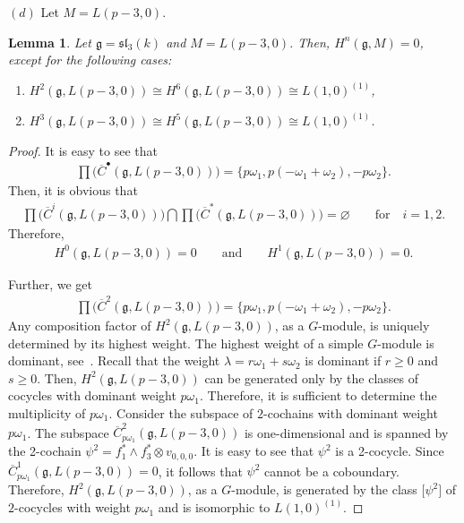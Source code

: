 \documentclass[10pt,a4paper]{amsart}
\numberwithin{equation}{section}
\newtheorem{Lemma}[Theorem]{Lemma}
\begin{document}
$(d)$ Let $M=L(p-3,0)$.

\begin{Lemma}\label{l3}
Let $\mathfrak{g}=\mathfrak{sl}_3(k)$ and $M=L(p-3,0)$. Then, $H^n(\mathfrak{g},M)=0$, except for the following cases:
\begin{enumerate}\itemsep=0pt

\item[$(i)$] $H^2(\mathfrak{g},L(p-3,0))\cong H^6(\mathfrak{g},L(p-3,0))\cong L(1,0)^{(1)}$,

\item[$(ii)$] $H^3(\mathfrak{g},L(p-3,0))\cong H^5(\mathfrak{g},L(p-3,0))\cong L(1,0)^{(1)}$.
\end{enumerate}
\end{Lemma}

\begin{proof}
It is easy to see that
\begin{gather*}
\prod\big(\overline{C}^{\bullet}(\mathfrak{g},L(p-3,0))\big)=
\{p\omega_1, p(-\omega_1+\omega_2), -p\omega_2\}.
\end{gather*}
Then, it is obvious that
\begin{gather*}
\prod\big(\overline{C}^i(\mathfrak{g},L(p-3,0))\big)\bigcap \prod\big(\overline{C}^*(\mathfrak{g},L(p-3,0))\big)=\varnothing
\qquad\text{for}\quad i=1,2.
\end{gather*}
Therefore,
\begin{gather*}
H^0(\mathfrak{g},L(p-3,0))=0\qquad\text{and}\qquad H^1(\mathfrak{g},L(p-3,0))=0.
\end{gather*}

Further, we get
\begin{gather*}
\prod\big(\overline{C}^2(\mathfrak{g},L(p-3,0))\big)=\{p\omega_1, p(-\omega_1+\omega_2), -p\omega_2\}.
\end{gather*}
 Any composition factor of $H^2(\mathfrak{g},L(p-3,0))$, as a $G$-module, is uniquely determined by its highest weight. The highest weight of a simple $G$-module is dominant, see~\cite[p.~260]{Humph80}. Recall that the weight $\lambda=r\omega_1+s\omega_2$ is dominant if $r\geq 0$ and $s\geq 0$. Then, $H^2(\mathfrak{g},L(p-3,0))$ can be generated only by the classes of cocycles with dominant weight $p\omega_1$. Therefore, it is sufficient to determine the multiplicity of $p\omega_1$. Consider the subspace of $2$-cochains with dominant weight~$p\omega_1$. The subspace
$\overline{C}^2_{p\omega_1}(\mathfrak{g},L(p-3,0))$ is one-dimensional and is spanned by the 2-cochain $\psi^2=f_1^*\wedge f_3^*\otimes v_{0,0,0}$. It is easy to see that $\psi^2$ is a 2-cocycle. Since $\overline{C}^1_{p\omega_1}(\mathfrak{g},L(p-3,0))\allowbreak=0$, it follows that $\psi^2$ cannot be a coboundary. Therefore, $H^2(\mathfrak{g},L(p-3,0))$, as a $G$-module, is generated by the class $\big[\psi^2\big]$ of $2$-cocycles with weight $p\omega_1$ and is isomorphic to $L(1,0)^{(1)}$.


\end{proof}
\end{document}
